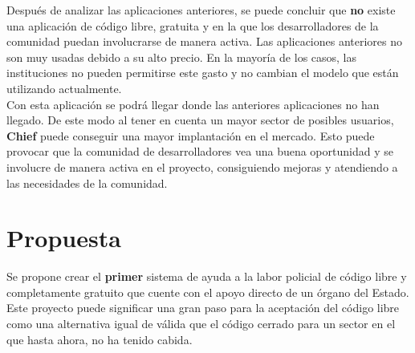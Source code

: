 Después de analizar las aplicaciones anteriores, se puede concluir que \textbf{no} existe una aplicación
de código libre, gratuita y en la que los desarrolladores de la comunidad puedan involucrarse de manera activa.
Las aplicaciones anteriores no son muy usadas debido a su alto precio. En la mayoría de los casos, las instituciones
no pueden permitirse este gasto y no cambian el modelo que están utilizando actualmente.\\


Con esta aplicación se podrá llegar donde las anteriores aplicaciones no han llegado. De este modo al tener en cuenta un mayor sector de posibles usuarios, 
\textbf{Chief} puede conseguir una mayor implantación en el mercado. Esto puede provocar que la comunidad de desarrolladores vea una buena oportunidad y se involucre 
de manera activa en el proyecto, consiguiendo mejoras y atendiendo a las necesidades de la comunidad.

\section{Propuesta}

Se propone crear el \textbf{primer} sistema de ayuda a la labor policial de código libre y completamente gratuito que cuente
con el apoyo directo de un órgano del Estado. Este proyecto puede significar una gran paso para la aceptación 
del código libre como una alternativa igual de válida que el código cerrado para un sector en el 
que hasta ahora, no ha tenido cabida.\\  
